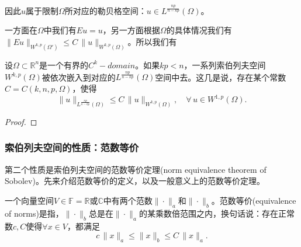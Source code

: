 因此$u$属于限制$\Omega$所对应的勒贝格空间：$u \in L^{\frac{np}{n-kp}}(\Omega)$。

一方面在$\Omega$中我们有$E u = u$，另一方面根据$\Omega$的具体情况我们有$\big\| E u \big\|_{W^{k,p} (\Omega')} \le C \, \big\| u \big\|_{W^{k,p}(\Omega)}$。所以我们有
\begin{corollary}[索伯列夫空间的嵌入定理$C=C(k,n,p,\Omega)$]
设$\Omega \subset \mathbb{R}^n$是一个有界的$C^k-domain$。如果$kp < n$，一系列索伯列夫空间$W^{k,p}(\Omega)$被依次嵌入到对应的$L^{\frac{np}{n-kp}}(\Omega)$空间中去。这几是说，存在某个常数$C=C(k,n,p,\Omega)$，使得
\begin{equation}
  \label{eq:sobolev-embedding-theorem-c-k-n-p-omega}
  \big\| u \big\|_{L^{\frac{np}{n-kp}}(\Omega)} \le C \, \big\| u \big\|_{W^{k,p}(\Omega)}, \quad \forall \, u \in W^{1,p}(\Omega).
\end{equation}
\end{corollary}
\begin{proof}

\end{proof}


\subsubsection{索伯列夫空间的性质：范数等价}
第二个性质是索伯列夫空间的范数等价定理(norm equivalence theorem of Sobolev)。先来介绍范数等价的定义，以及一般意义上的范数等价定理。
\begin{definition}[范数等价]
  \label{definition:equivalence-norm-def}
  一个向量空间$V \in \mathbb{F}=\mathbb{R}或\mathbb{C}$中有两个范数$\| \cdot \|_a$和$\| \cdot \|_b$。范数等价(equivalence of norms)是指，$\| \cdot \|_b$总是在$\| \cdot \|_a$的某乘数倍范围之内，换句话说：存在正常数$c,C$使得$\forall x \in V$，都满足
  \begin{equation*}
    c \, \|x\|_a \le \|x\|_b \le C \, \| x \|_a.
  \end{equation*}
\end{definition}

